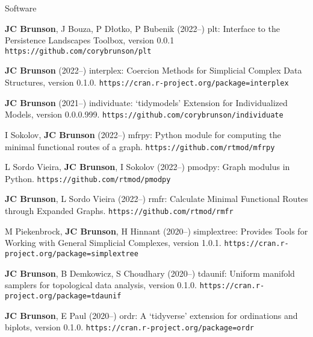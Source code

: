 \documentclass[10pt,a4paper]{article}
\begin{document}
%
\vspace{.25cm}
{\sc Software}
\begin{enumerate}[label={[\arabic*]},labelindent=1cm,nolistsep]
\setcounter{enumi}{\value{paper}}
\item
{\bfseries JC Brunson}, J Bouza, P Dłotko, P Bubenik (2022--) {\sffamily plt}: Interface to the Persistence Landscapes Toolbox, version 0.0.1 {\tt\small\nolinkurl{https://github.com/corybrunson/plt}}
\item
{\bfseries JC Brunson} (2022--) {\sffamily interplex}: Coercion Methods for Simplicial Complex Data Structures, version 0.1.0. {\tt\small\nolinkurl{https://cran.r-project.org/package=interplex}}
\item
{\bfseries JC Brunson} (2021--) {\sffamily individuate}: `tidymodels' Extension for Individualized Models, version 0.0.0.999. {\tt\small\nolinkurl{https://github.com/corybrunson/individuate}}
\item
I Sokolov, {\bfseries JC Brunson} (2022--) {\sffamily mfrpy}: Python module for computing the minimal functional routes of a graph. {\tt\small\nolinkurl{https://github.com/rtmod/mfrpy}}
\item
L Sordo Vieira, {\bfseries JC Brunson}, I Sokolov (2022--) {\sffamily pmodpy}: Graph modulus in Python. {\tt\small\nolinkurl{https://github.com/rtmod/pmodpy}}
\item
{\bfseries JC Brunson}, L Sordo Vieira (2022--) {\sffamily rmfr}: Calculate Minimal Functional Routes through Expanded Graphs. {\tt\small\nolinkurl{https://github.com/rtmod/rmfr}}
\item
M Piekenbrock, {\bfseries JC Brunson}, H Hinnant (2020--) {\sffamily simplextree}: Provides Tools for Working with General Simplicial Complexes, version 1.0.1. {\tt\small\nolinkurl{https://cran.r-project.org/package=simplextree}}
\item
{\bfseries JC Brunson}, B Demkowicz, S Choudhary (2020--) {\sffamily tdaunif}: Uniform manifold samplers for topological data analysis, version 0.1.0. {\tt\small\nolinkurl{https://cran.r-project.org/package=tdaunif}}
\item
{\bfseries JC Brunson}, E Paul (2020--) {\sffamily ordr}: A `tidyverse' extension for ordinations and biplots, version 0.1.0. {\tt\small\nolinkurl{https://cran.r-project.org/package=ordr}}
\item

\end{enumerate}
\end{document}
